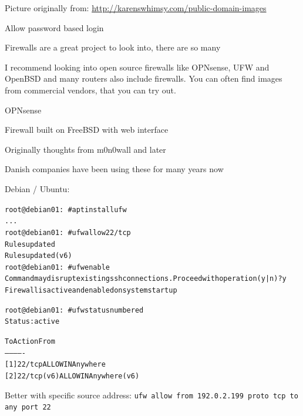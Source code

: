 \documentclass[Screen16to9,17pt]{foils}
\begin{document}

\centerline{Picture originally from: \url{http://karenswhimsy.com/public-domain-images}}

Allow password based login

Firewalls are a great project to look into, there are so many \smiley

I recommend looking into open source firewalls like OPNsense, UFW and OpenBSD and many routers also include firewalls. You can often find images from commercial vendors, that you can try out.





\begin{list2}
\item OPNsense 
\item Firewall built on FreeBSD with web interface
\item Originally thoughts from m0n0wall and later \\
\item Danish companies have been using these for many years now
\end{list2}



Debian / Ubuntu:
\begin{alltt}\scriptsize
root@debian01:~# apt install ufw
...
root@debian01:~# ufw allow 22/tcp
Rules updated
Rules updated (v6)
root@debian01:~# ufw enable
Command may disrupt existing ssh connections. Proceed with operation (y|n)? y
Firewall is active and enabled on system startup

root@debian01:~# ufw status numbered
Status: active

     To                         Action      From
     --                         ------      ----
[ 1] 22/tcp                     ALLOW IN    Anywhere
[ 2] 22/tcp (v6)                ALLOW IN    Anywhere (v6)
\end{alltt}



\begin{list2}
\item Better with specific source address: \verb+ufw allow from 192.0.2.199 proto tcp to any port 22+
\end{list2}
\end{document}
